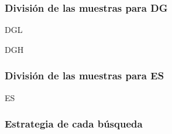 \begin{frame}
 \frametitle{Divisi\'on de las muestras para DG}
	\begin{block}{DGL}
		\begin{center}
		\end{center}
	\end{block}
	\begin{block}{DGH}
		\begin{center}
		\end{center}
	\end{block}
\end{frame}

\begin{frame}
 \frametitle{Divisi\'on de las muestras para ES}
	\begin{block}{ES}
		\begin{center}	 
		\end{center}
	\end{block}
\end{frame}


\begin{frame}
 \frametitle{Estrategia de cada b\'usqueda}
 \begin{center}
 \end{center}
\end{frame}

